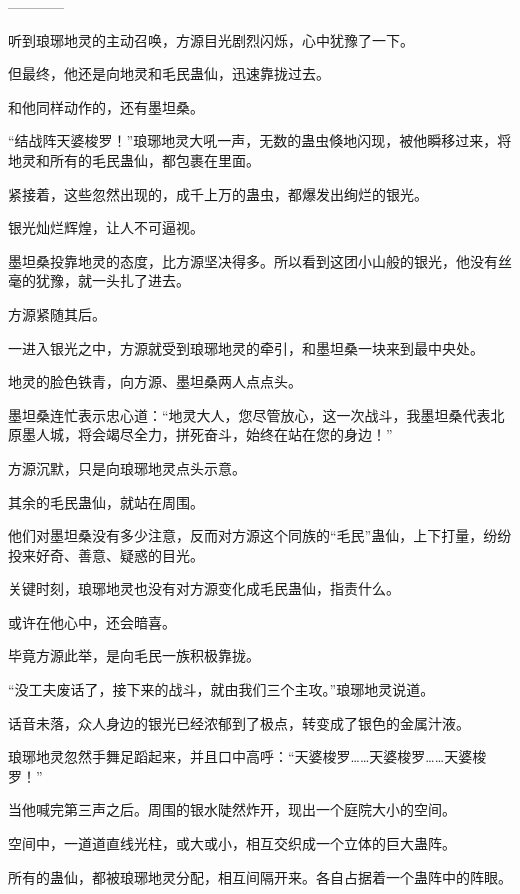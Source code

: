 
\begin{this_body}

------------

听到琅琊地灵的主动召唤，方源目光剧烈闪烁，心中犹豫了一下。

但最终，他还是向地灵和毛民蛊仙，迅速靠拢过去。

和他同样动作的，还有墨坦桑。

“结战阵天婆梭罗！”琅琊地灵大吼一声，无数的蛊虫倏地闪现，被他瞬移过来，将地灵和所有的毛民蛊仙，都包裹在里面。

紧接着，这些忽然出现的，成千上万的蛊虫，都爆发出绚烂的银光。

银光灿烂辉煌，让人不可逼视。

墨坦桑投靠地灵的态度，比方源坚决得多。所以看到这团小山般的银光，他没有丝毫的犹豫，就一头扎了进去。

方源紧随其后。

一进入银光之中，方源就受到琅琊地灵的牵引，和墨坦桑一块来到最中央处。

地灵的脸色铁青，向方源、墨坦桑两人点点头。

墨坦桑连忙表示忠心道：“地灵大人，您尽管放心，这一次战斗，我墨坦桑代表北原墨人城，将会竭尽全力，拼死奋斗，始终在站在您的身边！”

方源沉默，只是向琅琊地灵点头示意。

其余的毛民蛊仙，就站在周围。

他们对墨坦桑没有多少注意，反而对方源这个同族的“毛民”蛊仙，上下打量，纷纷投来好奇、善意、疑惑的目光。

关键时刻，琅琊地灵也没有对方源变化成毛民蛊仙，指责什么。

或许在他心中，还会暗喜。

毕竟方源此举，是向毛民一族积极靠拢。

“没工夫废话了，接下来的战斗，就由我们三个主攻。”琅琊地灵说道。

话音未落，众人身边的银光已经浓郁到了极点，转变成了银色的金属汁液。

琅琊地灵忽然手舞足蹈起来，并且口中高呼：“天婆梭罗……天婆梭罗……天婆梭罗！”

当他喊完第三声之后。周围的银水陡然炸开，现出一个庭院大小的空间。

空间中，一道道直线光柱，或大或小，相互交织成一个立体的巨大蛊阵。

所有的蛊仙，都被琅琊地灵分配，相互间隔开来。各自占据着一个蛊阵中的阵眼。


\end{this_body}
